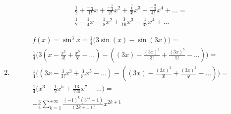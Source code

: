 \begin{enumerate}
\begin{gather*}
				\frac{1}{2} + \frac{-\frac{1}{4}}{1!}x + \frac{-\frac{1}{4}}{2!}x^2 + \frac{\frac{9}{8}}{3!}x^3 + \frac{-\frac{3}{4}}{4!}x^4 + \ldots = \\
				\frac{1}{2} - \frac{1}{4}x - \frac{1}{8}x^2 + \frac{3}{16}x^3 - \frac{1}{32}x^4 + \ldots 
			\end{gather*}
		\item
			\begin{gather*}
				f(x) = \sin^{3}x = \frac{1}{4} \Big(3\sin(x) - \sin(3x)\Big) = \\
				\frac{1}{4} \Big(3(x - \frac{x^{3}}{3!} + \frac{x^{5}}{5!} - \ldots) - ((3x) - \frac{(3x)^{3}}{3!} + \frac{(3x)^{5}}{5!} - \ldots)\Big) = \\
				\frac{1}{4} \Big((3x - \frac{3}{3!}x^{3} + \frac{3}{5!}x^{5} - \ldots) - ((3x) - \frac{(3x)^{3}}{3!} + \frac{(3x)^{5}}{5!} - \ldots)\Big) = \\
				\frac{1}{4} \Big( x^{3} - \frac{1}{2}x^{5} + \frac{13}{120}x^{7} - \ldots \Big) = \\
				-\frac{3}{4} \sum_{k = 1}^{+\infty} \frac{(-1)^{k} (3^{2k} - 1)}{(2k + 1)!} x^{2k + 1} 
			\end{gather*} 
		\end{enumerate}
		

